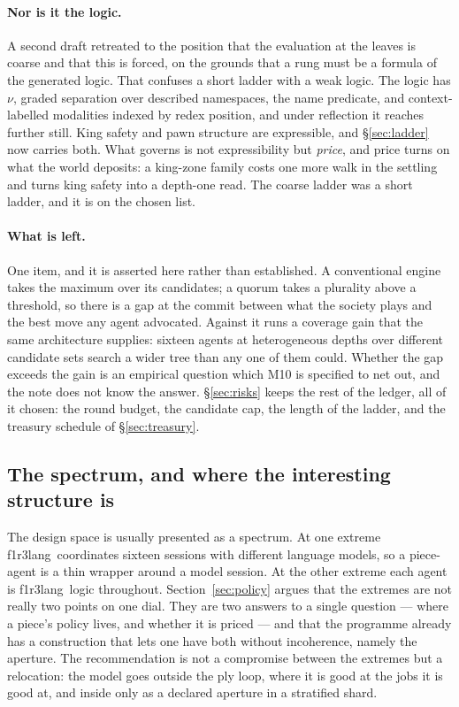 \documentclass[11pt,a4paper]{article}
\theoremstyle{plain}
\theoremstyle{definition}
\theoremstyle{remark}
\newcommand{\flang}{\textsf{f1r3lang}}
\begin{document}
\paragraph{Nor is it the logic.} A second draft retreated to the position that
the evaluation at the leaves is coarse and that this is forced, on the grounds
that a rung must be a formula of the generated logic. That confuses a short
ladder with a weak logic. The logic has $\nu$, graded separation over described
namespaces, the name predicate, and context-labelled modalities indexed by redex
position, and under reflection it reaches further still. King safety and pawn
structure are expressible, and \S\ref{sec:ladder} now carries both. What
governs is not expressibility but \emph{price}, and price turns on what the
world deposits: a king-zone family costs one more walk in the settling and turns
king safety into a depth-one read. The coarse ladder was a short ladder, and it
is on the chosen list.

\paragraph{What is left.} One item, and it is asserted here rather than
established. A conventional engine takes the maximum over its candidates; a
quorum takes a plurality above a threshold, so there is a gap at the commit
between what the society plays and the best move any agent advocated. Against it
runs a coverage gain that the same architecture supplies: sixteen agents at
heterogeneous depths over different candidate sets search a wider tree than any
one of them could. Whether the gap exceeds the gain is an empirical question
which M10 is specified to net out, and the note does not know the answer.
\S\ref{sec:risks} keeps the rest of the ledger, all of it chosen: the round
budget, the candidate cap, the length of the ladder, and the treasury schedule
of \S\ref{sec:treasury}.

\subsection{The spectrum, and where the interesting structure is}

The design space is usually presented as a spectrum. At one extreme \flang\
coordinates sixteen sessions with different language models, so a piece-agent is
a thin wrapper around a model session. At the other extreme each agent is
\flang\ logic throughout. Section~\ref{sec:policy} argues that the extremes are
not really two points on one dial. They are two answers to a single question ---
where a piece's policy lives, and whether it is priced --- and that the
programme already has a construction that lets one have both without incoherence,
namely the aperture. The recommendation is not a compromise between the extremes
but a relocation: the model goes outside the ply loop, where it is good at the
jobs it is good at, and inside only as a declared aperture in a stratified shard.
\end{document}
